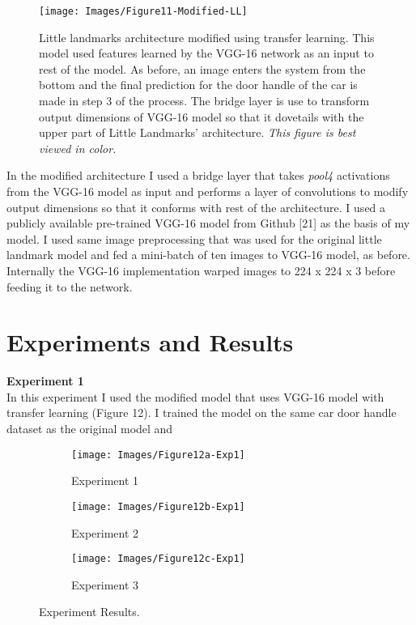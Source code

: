 \documentclass [11pt,letterpaper ,twoside ,openany ]{report}
\begin{document}
    \begin{figure}[h]
      \centering
      \texttt{[image: Images/Figure11-Modified-LL]}
      \caption{Little landmarks architecture modified using transfer learning. This model used features learned by the VGG-16 network as an input to rest of the model. As before, an image enters the system from the bottom and the final prediction for the door handle of the car is made in step 3 of the process. The bridge layer is use to transform output dimensions of VGG-16 model so that it dovetails with the upper part of Little Landmarks' architecture. \textit{This figure is best viewed in color.}}
      \label{fig:tl_arch}
    \end{figure}        

    In the modified architecture I used a bridge layer that takes \textit{pool4} activations from the VGG-16 model as input and performs a layer of convolutions to modify output dimensions so that it conforms with rest of the architecture. I used a publicly available pre-trained VGG-16 model from Github [21] as the basis of my model. I used same image preprocessing that was used for the original little landmark model and fed a mini-batch of ten images to VGG-16 model, as before. Internally the VGG-16 implementation warped images to 224 x 224 x 3 before feeding it to the network.    

    \section{Experiments and Results}

    \noindent
    \textbf{Experiment 1}\\    
    In this experiment I used the modified model that uses VGG-16 model with transfer learning (Figure 12). I trained the model on the same car door handle dataset as the original model and 

    \begin{wrapfigure}{l}[9mm]{0.5\textwidth}
        \begin{subfigure}[b]{\linewidth}
            \texttt{[image: Images/Figure12a-Exp1]}
            \caption{Experiment 1}
        \end{subfigure}
        \begin{subfigure}[b]{\linewidth}
            \texttt{[image: Images/Figure12b-Exp1]}
            \caption{Experiment 2}
        \end{subfigure}
        \begin{subfigure}[b]{\linewidth}
            \texttt{[image: Images/Figure12c-Exp1]}
            \caption{Experiment 3}
        \end{subfigure}        
        \caption{Experiment Results.}
    \end{wrapfigure}   
\end{document}
